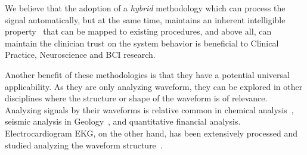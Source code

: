 \documentclass[brainsci,article,submit,moreauthors,pdftex,10pt,a4paper]{mdpi}
\begin{document}
We believe that the adoption of a \textit{hybrid} methodology which can process the signal automatically, but at the same time, maintains an inherent intelligible property~\citep{j2018challenge} that can be mapped to existing procedures, and above all, can maintain the clinician trust on the system behavior is beneficial to Clinical Practice, Neuroscience and BCI research. 



Another benefit of these methodologies is that they have a potential universal applicability.  As they are only analyzing waveform, they can be explored in other disciplines where the structure or shape of the waveform is of relevance.  Analyzing signals by their waveforms is relative common in chemical analysis~\citep{Skoog2000}, seismic analysis in Geology~\citep{Owens1984}, and quantitative financial analysis.  Electrocardiogram EKG, on the other hand, has been extensively processed and studied analyzing the waveform structure~\citep{Stockman1976}.


%
%
%
%
\end{document}
